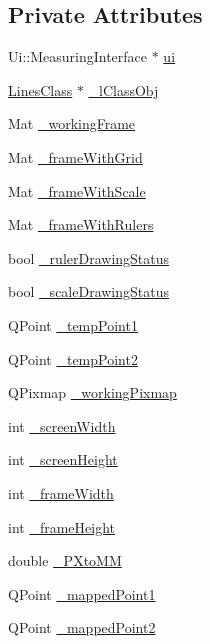 \subsection*{Private Attributes}
\begin{DoxyCompactItemize}
\item 
Ui\+::\+Measuring\+Interface $\ast$ \mbox{\hyperlink{classMeasuringInterface_a6f8e1020a154cb26eb10d3755130e22f}{ui}}
\item 
\mbox{\hyperlink{classLinesClass}{Lines\+Class}} $\ast$ \mbox{\hyperlink{classMeasuringInterface_a9041174b9059c7c9ac971f0a6c67e551}{\+\_\+l\+Class\+Obj}}
\item 
Mat \mbox{\hyperlink{classMeasuringInterface_aaedd365e7de53beea419a6ae95f63ac5}{\+\_\+working\+Frame}}
\item 
Mat \mbox{\hyperlink{classMeasuringInterface_a0b2423351c5a351110df2db168394aac}{\+\_\+frame\+With\+Grid}}
\item 
Mat \mbox{\hyperlink{classMeasuringInterface_ae48829083f032ec2a2901ef1ee0cdbff}{\+\_\+frame\+With\+Scale}}
\item 
Mat \mbox{\hyperlink{classMeasuringInterface_a0c84bf7462820d0185b7933f708a5b78}{\+\_\+frame\+With\+Rulers}}
\item 
bool \mbox{\hyperlink{classMeasuringInterface_ac165bee9175399843d34797f9959aab9}{\+\_\+ruler\+Drawing\+Status}}
\item 
bool \mbox{\hyperlink{classMeasuringInterface_a383a71c4ec7a3dc4d22fdb1b298d6755}{\+\_\+scale\+Drawing\+Status}}
\item 
Q\+Point \mbox{\hyperlink{classMeasuringInterface_afc55152e0f55babf36912f7b266df1d7}{\+\_\+temp\+Point1}}
\item 
Q\+Point \mbox{\hyperlink{classMeasuringInterface_a0b492738da676dc2d7659f47f43ce755}{\+\_\+temp\+Point2}}
\item 
Q\+Pixmap \mbox{\hyperlink{classMeasuringInterface_a2c02a44d7418c991870d586336d1b30f}{\+\_\+working\+Pixmap}}
\item 
int \mbox{\hyperlink{classMeasuringInterface_a420b43490b911817514f5d0164f67f72}{\+\_\+screen\+Width}}
\item 
int \mbox{\hyperlink{classMeasuringInterface_a0f1f2b4d7b3351b923d4a45c3726ad3f}{\+\_\+screen\+Height}}
\item 
int \mbox{\hyperlink{classMeasuringInterface_abd25849865da846f5fcd8d253dec2158}{\+\_\+frame\+Width}}
\item 
int \mbox{\hyperlink{classMeasuringInterface_ad5df82a497791ea7bbf03548f389cb5b}{\+\_\+frame\+Height}}
\item 
double \mbox{\hyperlink{classMeasuringInterface_a9424e09f5caa438c903c919618a2bf28}{\+\_\+\+P\+Xto\+MM}}
\item 
Q\+Point \mbox{\hyperlink{classMeasuringInterface_a4b23773d20cd818a16eb73b3c20d42ba}{\+\_\+mapped\+Point1}}
\item 
Q\+Point \mbox{\hyperlink{classMeasuringInterface_ad387f8c8650644bdb62f73372e1e617a}{\+\_\+mapped\+Point2}}
\end{DoxyCompactItemize}


